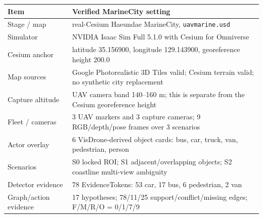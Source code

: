\begin{tabular}{ll}
\toprule
Item & Verified MarineCity setting \\
\midrule
Stage / map & real-Cesium Haeundae MarineCity, \texttt{uavmarine.usd} \\
Simulator & NVIDIA Isaac Sim Full 5.1.0 with Cesium for Omniverse \\
Cesium anchor & latitude 35.156900, longitude 129.143900, georeference height 200.0 \\
Map sources & Google Photorealistic 3D Tiles valid; Cesium terrain valid; no synthetic city replacement \\
Capture altitude & UAV camera band 140--160 m; this is separate from the Cesium georeference height \\
Fleet / cameras & 3 UAV markers and 3 capture cameras; 9 RGB/depth/pose frames over 3 scenarios \\
Actor overlay & 6 VisDrone-derived object cards: bus, car, truck, van, pedestrian, person \\
Scenarios & S0 locked ROI; S1 adjacent/overlapping objects; S2 coastline multi-view ambiguity \\
Detector evidence & 78 EvidenceTokens: 53 car, 17 bus, 6 pedestrian, 2 van \\
Graph/action evidence & 17 hypotheses; 78/11/25 support/conflict/missing edges; F/M/R/O = 0/1/7/9 \\
\bottomrule
\end{tabular}
